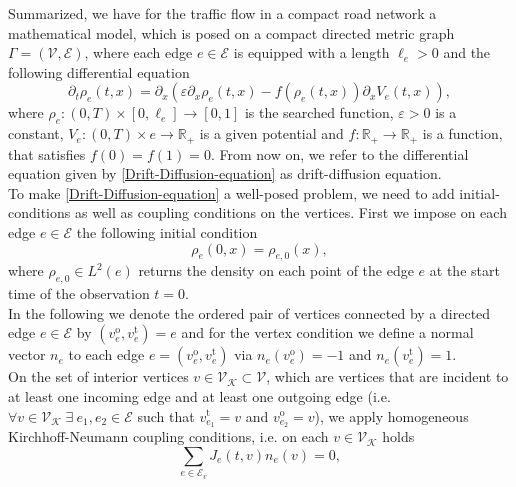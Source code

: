 Summarized, we have for the traffic flow in a compact road network a mathematical model, which is posed on a compact directed metric graph $\Gamma = (\mathcal{V}, \mathcal{E})$, where each edge $e \in \mathcal{E}$ is equipped with a length $\ell_e > 0$ and the following differential equation
\begin{equation} 
    \label{Drift-Diffusion-equation}
    \partial_t \rho_e (t,x) = \partial_x (\varepsilon \partial_x \rho_e (t,x) - f(\rho_e (t,x) ) \partial_x V_e (t,x)),
\end{equation}
where $\rho_e \colon (0, T) \times [0, \ell_e] \to [0, 1]$ is the searched function, $\varepsilon > 0$ is a constant, $V_e \colon (0,T) \times e \to \mathbb{R}_{+}$ is a given potential and $f \colon \mathbb{R}_{+} \to \mathbb{R}_{+}$ is a function, that satisfies $f(0) = f(1) = 0$. From now on, we refer to the differential equation given by \cref{Drift-Diffusion-equation} as drift-diffusion equation. \\
To make \cref{Drift-Diffusion-equation} a well-posed problem, we need to add initial-conditions as well as coupling conditions on the vertices. First we impose on each edge $e \in \mathcal{E}$ the following initial condition
\begin{equation}
    \label{eq:initial_conditions}
    \rho_e(0,x) = \rho_{e, 0}(x),
\end{equation}
where $\rho_{e, 0} \in L^2(e)$ returns the density on each point of the edge $e$ at the start time of the observation $t=0$. \\ 
In the following we denote the ordered pair of vertices connected by a directed edge $e \in \mathcal{E}$ by $(v^{\operatorname{o}}_e, v^{\operatorname{t}}_e) = e$ and for the vertex condition we define a normal vector $n_e$ to each edge $e = (v^{\operatorname{o}}_e, v^{\operatorname{t}}_e)$ via $n_e(v^{\operatorname{o}}_e) = -1$ and $n_e(v^{\operatorname{t}}_e) = 1$. \\
On the set of interior vertices $v \in \mathcal{V}_\mathcal{K} \subset \mathcal{V}$, which are vertices that are incident to at least one incoming edge and at least one outgoing edge (i.e. $\forall v \in \mathcal{V}_\mathcal{K} \; \exists \ e_1, e_2 \in \mathcal{E}$ such that $v^{\operatorname{t}}_{e_1} = v$ and $v^{\operatorname{o}}_{e_2} = v$), we apply homogeneous Kirchhoff-Neumann coupling conditions, i.e. on each $v \in \mathcal{V}_\mathcal{K}$ holds
\begin{equation}
    \label{eq:Kirchhoff_Neumann_condition}
    \sum_{e\in \mathcal{E}_v} J_e(t,v) n_e (v)=0,
\end{equation}
